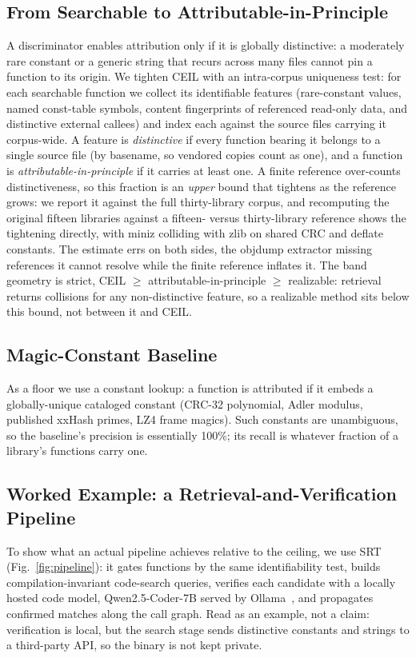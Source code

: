 \documentclass[conference]{IEEEtran}
\begin{document}
\subsection{From Searchable to Attributable-in-Principle}
A discriminator enables attribution only if it is globally distinctive: a moderately
rare constant or a generic string that recurs across many files cannot pin a function
to its origin. We tighten CEIL with an intra-corpus uniqueness test: for each
searchable function we collect its identifiable features (rare-constant values, named
const-table symbols, content fingerprints of referenced read-only data, and distinctive
external callees) and index each against the source files carrying it corpus-wide. A
feature is \emph{distinctive} if every function bearing it belongs to a single source
file (by basename, so vendored copies count as one), and a function is
\emph{attributable-in-principle} if it carries at least one. A finite reference
over-counts distinctiveness, so this fraction is an \emph{upper} bound that tightens as
the reference grows: we report it against the full thirty-library corpus, and
recomputing the original fifteen libraries against a fifteen- versus thirty-library
reference shows the tightening directly, with miniz colliding with zlib on shared CRC
and deflate constants. The estimate errs on both sides, the objdump extractor missing
references it cannot resolve while the finite reference inflates it. The band geometry
is strict, CEIL $\geq$ attributable-in-principle $\geq$
realizable: retrieval returns collisions for any non-distinctive feature, so a
realizable method sits below this bound, not between it and CEIL.

\subsection{Magic-Constant Baseline}
As a floor we use a constant lookup: a function is attributed if it embeds a
globally-unique cataloged constant (CRC-32 polynomial, Adler modulus, published
xxHash primes, LZ4 frame magics). Such constants are unambiguous, so the
baseline's precision is essentially 100\%; its recall is whatever fraction of a
library's functions carry one.

\subsection{Worked Example: a Retrieval-and-Verification Pipeline}
To show what an actual pipeline achieves relative to the ceiling, we
use SRT (Fig.~\ref{fig:pipeline}): it gates functions by the same identifiability
test, builds compilation-invariant code-search queries, verifies each candidate
with a locally hosted code model, Qwen2.5-Coder-7B served by Ollama~\cite{qwen25coder,ollama}, and propagates confirmed matches
along the call graph. Read as an example, not a claim: verification is local, but the
search stage sends distinctive constants and strings to a third-party API, so the
binary is not kept private.
\end{document}
